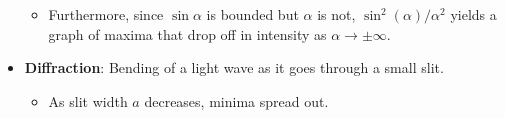 \documentclass[../notes.tex]{subfiles}
\begin{document}
\begin{itemize}
\begin{itemize}
        \item Furthermore, since $\sin\alpha$ is bounded but $\alpha$ is not, $\sin^2(\alpha)/\alpha^2$ yields a graph of maxima that drop off in intensity as $\alpha\to\pm\infty$.
    \end{itemize}
    \item \textbf{Diffraction}: Bending of a light wave as it goes through a small slit.
    \begin{itemize}
        \item As slit width $a$ decreases, minima spread out.
    \end{itemize}
\end{itemize}
\end{document}
